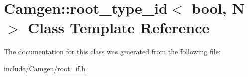 \hypertarget{a00483}{}\section{Camgen\+:\+:root\+\_\+type\+\_\+id$<$ bool, N $>$ Class Template Reference}
\label{a00483}


The documentation for this class was generated from the following file\+:\begin{DoxyCompactItemize}
\item 
include/\+Camgen/\hyperlink{a00760}{root\+\_\+if.\+h}\end{DoxyCompactItemize}
